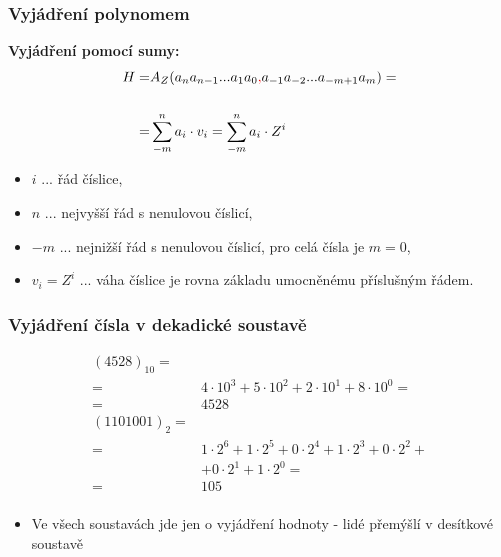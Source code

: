 	\begin{frame}
    \frametitle{Vyjádření polynomem}
		
		\begin{minipage}[t][0.4\textheight][t]{\textwidth}
    \textbf{Vyjádření pomocí sumy:}
      \small
			\boldmath
			\begin{align*}
      H =& A_{Z}(a_{n} a_{n-1} ... a_{1} a_{0}\textcolor{red}{,} a_{-1} a_{-2} ... a_{-m+1} a_{m}) =\\ \\
				=& \sum^{n}_{-m} a_i\cdot v_i = \sum^{n}_{-m} a_i\cdot Z^i
			\end{align*}
		\end{minipage}
		
		\begin{minipage}[t][0.5\textheight][t]{\textwidth}
			\boldmath
			\begin{itemize}
				\item $i$ ... řád číslice,
				\item $n$ ... nejvyšší řád s nenulovou číslicí,
        \item $-m$ ... nejnižší řád s nenulovou číslicí, pro celá čísla je  $m=0$,
        \item $v_i = Z^i$ ... váha číslice je rovna základu umocněnému příslušným řádem.
			\end{itemize}
			
		\end{minipage}
	\end{frame}
	
	\begin{frame}
    \frametitle{Vyjádření čísla v dekadické soustavě}
		
		\begin{minipage}[t][0.6\textheight][t]{\textwidth}
			\boldmath
			\begin{align*}
			(4528)_{10} =& \\ 
				=& 4 \cdot 10^3 + 5 \cdot 10^2 + 2 \cdot 10^1 + 8 \cdot 10^0 =\\ 
				=& 4528\\ 
			(1101001)_{2} =& \\ 
				=& 1 \cdot 2^6 + 1 \cdot 2^5 + 0 \cdot 2^4 + 1 \cdot 2^3 + 0 \cdot 2^2 +\\
				&+ 0 \cdot 2^1 + 1 \cdot 2^0 =\\ 
				=& 105\\ 
			\end{align*}
		\end{minipage}
		
		\begin{minipage}[t][0.4\textheight][t]{\textwidth}
			\boldmath
			\begin{itemize}
				\item Ve všech soustavách jde jen o vyjádření hodnoty - lidé přemýšlí v desítkové soustavě
			\end{itemize}
			
		\end{minipage}
	\end{frame}
	
